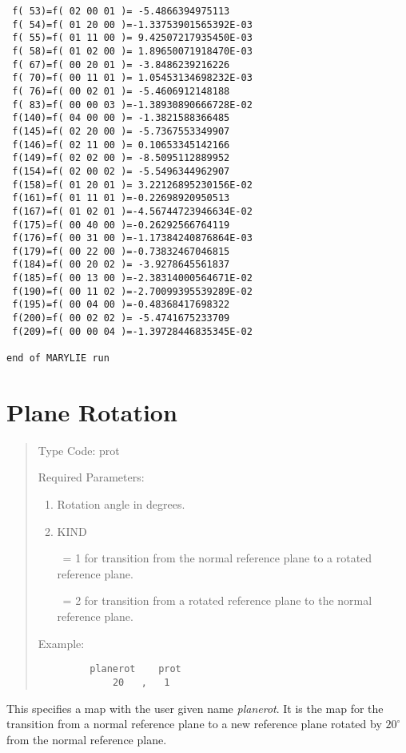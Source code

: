 \begin{footnotesize}
\begin{verbatim}
 f( 53)=f( 02 00 01 )= -5.4866394975113
 f( 54)=f( 01 20 00 )=-1.33753901565392E-03
 f( 55)=f( 01 11 00 )= 9.42507217935450E-03
 f( 58)=f( 01 02 00 )= 1.89650071918470E-03
 f( 67)=f( 00 20 01 )= -3.8486239216226
 f( 70)=f( 00 11 01 )= 1.05453134698232E-03
 f( 76)=f( 00 02 01 )= -5.4606912148188
 f( 83)=f( 00 00 03 )=-1.38930890666728E-02
 f(140)=f( 04 00 00 )= -1.3821588366485
 f(145)=f( 02 20 00 )= -5.7367553349907
 f(146)=f( 02 11 00 )= 0.10653345142166
 f(149)=f( 02 02 00 )= -8.5095112889952
 f(154)=f( 02 00 02 )= -5.5496344962907
 f(158)=f( 01 20 01 )= 3.22126895230156E-02
 f(161)=f( 01 11 01 )=-0.22698920950513
 f(167)=f( 01 02 01 )=-4.56744723946634E-02
 f(175)=f( 00 40 00 )=-0.26292566764119
 f(176)=f( 00 31 00 )=-1.17384240876864E-03
 f(179)=f( 00 22 00 )=-0.73832467046815
 f(184)=f( 00 20 02 )= -3.9278645561837
 f(185)=f( 00 13 00 )=-2.38314000564671E-02
 f(190)=f( 00 11 02 )=-2.70099395539289E-02
 f(195)=f( 00 04 00 )=-0.48368417698322
 f(200)=f( 00 02 02 )= -5.4741675233709
 f(209)=f( 00 00 04 )=-1.39728446835345E-02

end of MARYLIE run
\end{verbatim}
\end{footnotesize}

\newpage
\section{Plane Rotation}
\begin{quotation}
\noindent Type Code:  prot
\vspace{5mm}

\noindent Required Parameters:
\begin{enumerate}
    \item  Rotation angle in degrees.
    \item  KIND

           \ = 1 for transition from the normal reference plane to a
                rotated reference \hspace*{1.5em} plane.

           \ = 2 for transition from a rotated reference plane to the
                normal reference \hspace*{1.5em} plane.
\end{enumerate}

\vspace{5mm}
\noindent Example:
\begin{verbatim}
         planerot    prot
             20   ,   1
\end{verbatim}
\end{quotation}
This specifies a map with the user given name {\em planerot}.  It is the map for
the transition from a normal reference plane to a new reference plane
rotated by $20^\circ$ from the normal reference plane.

